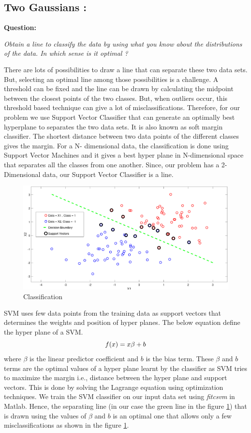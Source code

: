 \documentclass[12pt]{report}
\begin{document}
	\subsection{Two Gaussians :}	
{\bf Question:} {\textit{Obtain a line to classify the data by using what you know about the distributions of the data. In which sense is it optimal ?}
	
	There are lots of possibilities to draw a line that can separate these two data sets. But, selecting an optimal line among those possibilities is a challenge. A threshold can be fixed and the line can be drawn by calculating the midpoint between the closest points of the two classes. But, when outliers occur, this threshold based technique can give a lot of misclassifications. Therefore, for our problem we use Support Vector Classifier that can generate an optimally best hyperplane to separates the two data sets. It is also known as soft margin classifier. The shortest distance between two data points of the different classes gives the margin. For a N- dimensional data, the classification is done using Support Vector Machines and it gives a best hyper plane in N-dimensional space that separates all the classes from one another. Since, our problem has a 2-Dimensional data, our Support Vector Classifier is a line.
	 \begin{figure}
	 	\begin{center}
	 		\includegraphics[height=6 cm,width= 9.5 cm]{Ex1.1.eps} 
	 		\caption{Classification}
	 		\label{fig:SVC}
	 	\end{center}
	\end{figure}
 
	 SVM uses few data points from the training data as support vectors that determines the weights and position of hyper planes. The below equation define the hyper plane of a SVM.
	 \begin{equation}\label{eq:1}
	 \centering
	 f(x)=x{\beta}+b
	 \end{equation}
	  where $\beta$ is the linear predictor coefficient and $b$ is the bias term.  These $\beta$ and $b$ terms are the optimal values of a hyper plane learnt by the classifier as SVM tries to maximize the margin i.e., distance between the hyper plane and support vectors. This is done by solving the Lagrange equation using optimization techniques. We train the SVM classifier on our input data set using {\textit{ fitcsvm}} in Matlab. 
	  Hence, the separating line (in our case the green line in the figure \ref{fig:SVC}) that is drawn using the values of $\beta$ and $b$ is an optimal one that allows only a few misclassifications as shown in the figure \ref{fig:SVC}.  
}
\end{document}
